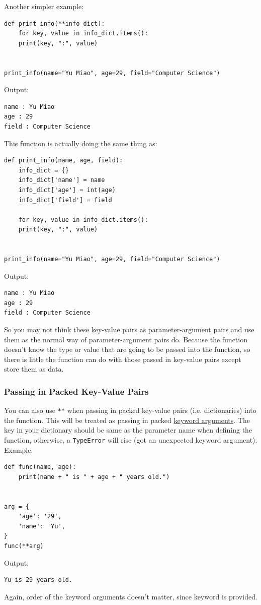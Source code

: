 \documentclass[12pt]{book}
\begin{document}
Another simpler example:
\begin{verbatim}
def print_info(**info_dict):
    for key, value in info_dict.items():
	print(key, ":", value)


print_info(name="Yu Miao", age=29, field="Computer Science")
\end{verbatim}
Output:
\begin{verbatim}
name : Yu Miao
age : 29
field : Computer Science
\end{verbatim}
This function is actually doing the same thing as:
\begin{verbatim}
def print_info(name, age, field):
    info_dict = {}
    info_dict['name'] = name
    info_dict['age'] = int(age)
    info_dict['field'] = field

    for key, value in info_dict.items():
	print(key, ":", value)


print_info(name="Yu Miao", age=29, field="Computer Science")
\end{verbatim}
Output:
\begin{verbatim}
name : Yu Miao
age : 29
field : Computer Science
\end{verbatim}

So you may not think these key-value pairs as parameter-argument pairs and use them as the normal way of parameter-argument pairs do. Because the function doesn't know the type or value that are going to be passed into the function, so there is little the function can do with those passed in key-value pairs except store them as data.
\subsubsection{Passing in Packed Key-Value Pairs}
\label{sec:orgfab76bf}
You can also use \texttt{**} when passing in packed key-value pairs (i.e. dictionaries) into the function. This will be treated as passing in packed \hyperref[org8749712]{keyword arguments}. The key in your dictionary should be same as the parameter name when defining the function, otherwise, a \texttt{TypeError} will rise (got an unexpected keyword argument). Example:
\begin{verbatim}
def func(name, age):
    print(name + " is " + age + " years old.")


arg = {
    'age': '29',
    'name': 'Yu',
}
func(**arg)
\end{verbatim}
Output:
\begin{verbatim}
Yu is 29 years old.
\end{verbatim}
Again, order of the keyword arguments doesn't matter, since keyword is provided.
\end{document}
